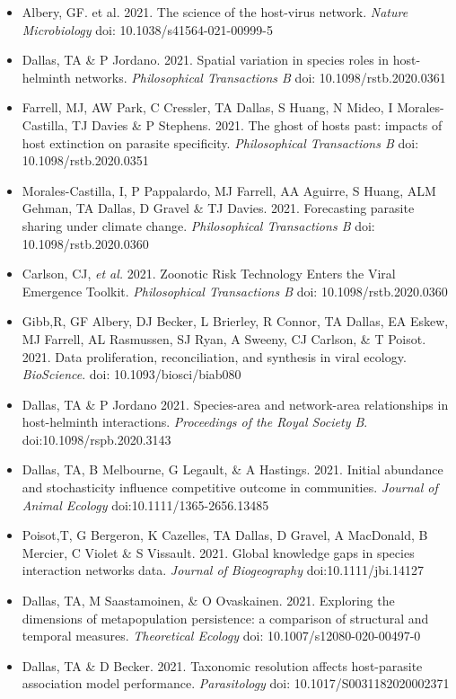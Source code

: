 \documentclass[]{CV}
\begin{document}
\begin{itemize}

\item Albery, GF. et al. 2021. The science of the host-virus network. \textit{Nature Microbiology} doi: 10.1038/s41564-021-00999-5

\item {\mefont Dallas, TA} \& P Jordano. 2021. Spatial variation in species roles in host-helminth networks. \textit{Philosophical Transactions B} doi: 10.1098/rstb.2020.0361

\item Farrell, MJ, AW Park, C Cressler, {\mefont TA Dallas}, S Huang, N Mideo, I Morales-Castilla, TJ Davies \& P Stephens. 2021. The ghost of hosts past: impacts of host extinction on parasite specificity. \textit{Philosophical Transactions B} doi: 10.1098/rstb.2020.0351

\item Morales-Castilla, I, P Pappalardo, MJ Farrell, AA Aguirre, S Huang, ALM Gehman, {\mefont TA Dallas}, D Gravel \& TJ Davies. 2021. Forecasting parasite sharing under climate change. \textit{Philosophical Transactions B} doi: 10.1098/rstb.2020.0360

\item Carlson, CJ, \textit{et al.} 2021. Zoonotic Risk Technology Enters the Viral Emergence Toolkit. \textit{Philosophical Transactions B} doi: 10.1098/rstb.2020.0360

\item Gibb,R, GF Albery, DJ Becker, L Brierley, R Connor, {\mefont TA Dallas}, EA Eskew, MJ Farrell, AL Rasmussen, SJ Ryan, A Sweeny, CJ Carlson, \& T Poisot. 2021. Data proliferation, reconciliation, and synthesis in viral ecology. \textit{BioScience}. doi: 10.1093/biosci/biab080

\item {\mefont Dallas, TA} \& P Jordano 2021. Species-area and network-area relationships in host-helminth interactions. \textit{Proceedings of the Royal Society B}. doi:10.1098/rspb.2020.3143

\item {\mefont Dallas, TA}, B Melbourne, G Legault, \& A Hastings. 2021. Initial abundance and stochasticity influence competitive outcome in communities. \textit{Journal of Animal Ecology} doi:10.1111/1365-2656.13485

\item Poisot,T, G Bergeron, K Cazelles, {\mefont TA Dallas}, D Gravel, A MacDonald, B Mercier, C Violet \& S Vissault. 2021. Global knowledge gaps in species interaction networks data. \textit{Journal of Biogeography} doi:10.1111/jbi.14127

\item {\mefont Dallas, TA}, M Saastamoinen, \& O Ovaskainen. 2021. Exploring the dimensions of metapopulation persistence: a comparison of structural and temporal measures. \textit{Theoretical Ecology} doi: 10.1007/s12080-020-00497-0 

\item {\mefont Dallas, TA} \& D Becker. 2021. Taxonomic resolution affects host-parasite association model performance. \textit{Parasitology} doi: 10.1017/S0031182020002371
\end{itemize}
\end{document}
